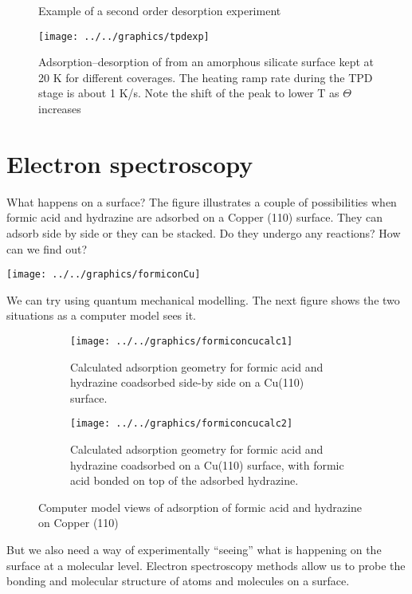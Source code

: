 \documentclass[ignorenonframetext]{beamer}
\begin{document}
\begin{figure}[H]
\centering
Example of a second order desorption experiment

\texttt{[image: ../../graphics/tpdexp]}
\caption{Adsorption–desorption of  from an amorphous silicate surface kept at 20 K for different coverages. The heating ramp rate during the TPD stage is about 1 K/s. Note the shift of the peak to lower T as \(\Theta\) increases}
\end{figure}

\section{Electron spectroscopy}

What happens on a surface? The figure illustrates a couple of possibilities when formic acid and hydrazine are adsorbed on a Copper (110) surface. They can adsorb side by side or they can be stacked. Do they undergo any reactions? How can we find out?

\begin{center}\texttt{[image: ../../graphics/formiconCu]}\end{center}

We can try using quantum mechanical modelling. The next figure shows the two situations as a computer model sees it.

\begin{figure}[H]
\centering
\begin{subfigure}[t]{.4\textwidth}
\texttt{[image: ../../graphics/formiconcucalc1]}
\caption{Calculated adsorption geometry for formic acid and hydrazine coadsorbed side-by
side on a Cu(110) surface.}
\end{subfigure}
\begin{subfigure}[t]{.4\textwidth}
\texttt{[image: ../../graphics/formiconcucalc2]}
\caption{Calculated adsorption geometry for formic acid and hydrazine coadsorbed on a
Cu(110) surface, with formic acid bonded on top of the adsorbed hydrazine. }
\end{subfigure}
\caption{Computer model views of adsorption of formic acid and hydrazine on Copper (110)}
\end{figure}

But we also need a way of experimentally ``seeing'' what is happening on the surface at a molecular level. Electron spectroscopy methods allow us to probe the bonding and molecular structure of atoms and molecules on a surface.
\end{document}
